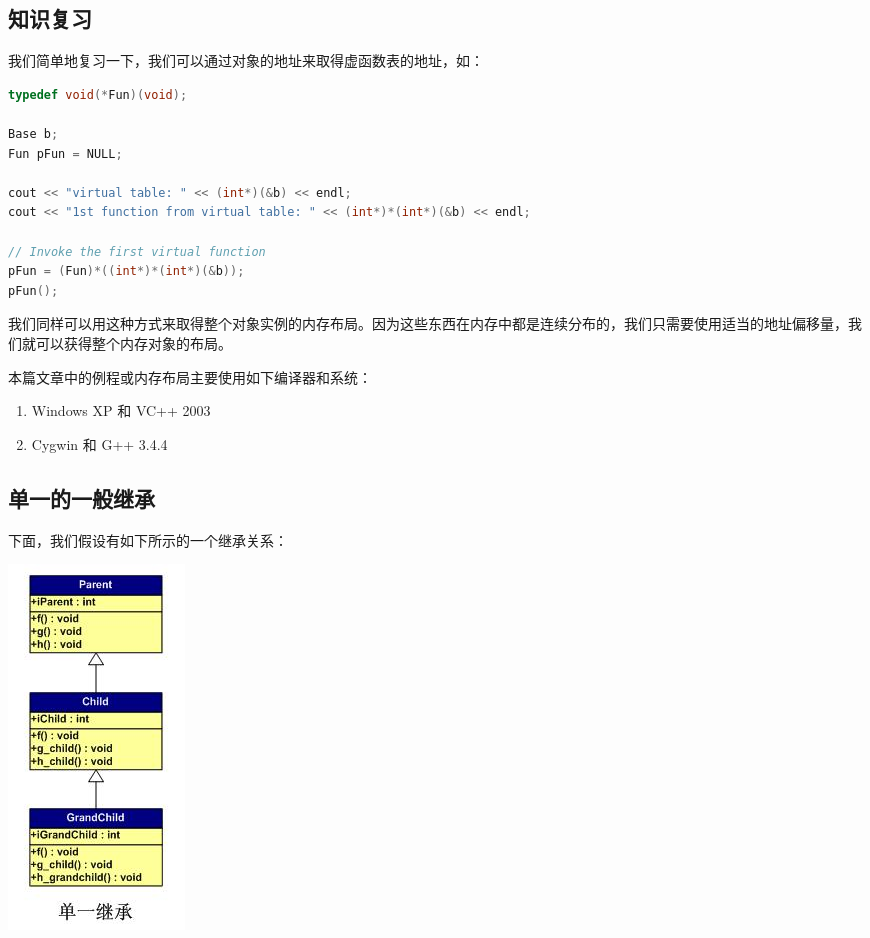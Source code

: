 \documentclass{article}
\begin{document}
\begin{CJK}{UTF8}{gbsn}
\subsection{知识复习}

我们简单地复习一下，我们可以通过对象的地址来取得虚函数表的地址，如：

\begin{lstlisting}[language=C++]
typedef void(*Fun)(void);

Base b;
Fun pFun = NULL;
 
cout << "virtual table: " << (int*)(&b) << endl;
cout << "1st function from virtual table: " << (int*)*(int*)(&b) << endl;
 
// Invoke the first virtual function 
pFun = (Fun)*((int*)*(int*)(&b));
pFun();
\end{lstlisting}
我们同样可以用这种方式来取得整个对象实例的内存布局。因为这些东西在内存中都是连续分布的，我们只需要使用适当的地址偏移量，我们就可以获得整个内存对象的布局。
 
本篇文章中的例程或内存布局主要使用如下编译器和系统：
\begin{enumerate}
\item Windows XP 和 VC++ 2003
\item Cygwin 和 G++ 3.4.4
\end{enumerate}


\subsection{单一的一般继承}

下面，我们假设有如下所示的一个继承关系：

\includegraphics{mi0.jpg}


\end{CJK}
\end{document}
